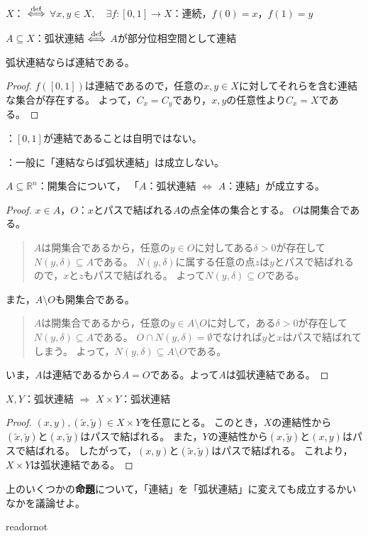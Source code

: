 \documentclass[uplatex]{jsarticle}
\begin{document}
\begin{teigi}[弧状連結性]
  $X$： $\overset{\mathrm{def}}{\Longleftrightarrow}$ $\forall x, y \in X, \quad \exists f \colon \left[ 0, 1 \right] \longrightarrow X$：連続，$f(0) = x$，$f(1) = y$

  $A \subseteq X$：弧状連結 $\overset{\mathrm{def}}{\Longleftrightarrow}$ $A$が部分位相空間として連結
\end{teigi}

\begin{prop}
  弧状連結ならば連結である。
\end{prop}

\begin{proof}
  $f([0,1])$は連結であるので，任意の$x,y \in X$に対してそれらを含む連結な集合が存在する。
  よって，$C_{x} = C_{y}$であり，$x,y$の任意性より$C_{x} = X$である。
\end{proof}

：$[0,1]$が連結であることは自明ではない。

：一般に「連結ならば弧状連結」は成立しない。

\begin{prop}
  $A \subseteq \mathbb{R}^{n}$：開集合について，
  「$A$：弧状連結 $\Longleftrightarrow$ $A$：連結」が成立する。
\end{prop}

\begin{proof}
   $x \in A$，$O$：$x$とパスで結ばれる$A$の点全体の集合とする。
  $O$は開集合である。
  \begin{quote}
    $A$は開集合であるから，任意の$y \in O$に対してある$\delta > 0$が存在して$N(y,\delta) \subseteq A$である。
    $N(y,\delta)$に属する任意の点$z$は$y$とパスで結ばれるので，$x$と$z$もパスで結ばれる。
    よって$N(y,\delta) \subseteq O$である。
  \end{quote}
  また，$A \setminus O$も開集合である。
  \begin{quote}
    $A$は開集合であるから，任意の$y \in A \setminus O$に対して，ある$\delta > 0$が存在して$N(y,\delta) \subseteq A$である。
    $O \cap N(y,\delta) = \emptyset$でなければ$y$と$x$はパスで結ばれてしまう。
    よって，$N(y,\delta) \subseteq A \setminus O$である。
  \end{quote}
  いま，$A$は連結であるから$A = O$である。よって$A$は弧状連結である。
\end{proof}

\begin{prop}
  $X,Y$：弧状連結 $\Longrightarrow$ $X \times Y$：弧状連結
\end{prop}

\begin{proof}
  $(x, y) , (\tilde{x}, \tilde{y}) \in X \times Y$を任意にとる。
  このとき，$X$の連結性から$(\tilde{x}, \tilde{y})$と$(x, \tilde{y})$はパスで結ばれる。
  また，$Y$の連結性から$(x, \tilde{y})$と$(x,y)$はパスで結ばれる。
  したがって，$(x,y)$と$(\tilde{x}, \tilde{y})$はパスで結ばれる。
  これより，$X \times Y$は弧状連結である。
\end{proof}

上のいくつかの{\bf 命題}について，「連結」を「弧状連結」に変えても成立するかいなかを議論せよ。

\expandafter\ifx\csname readornot\endcsname\relax
  
\end{document}
